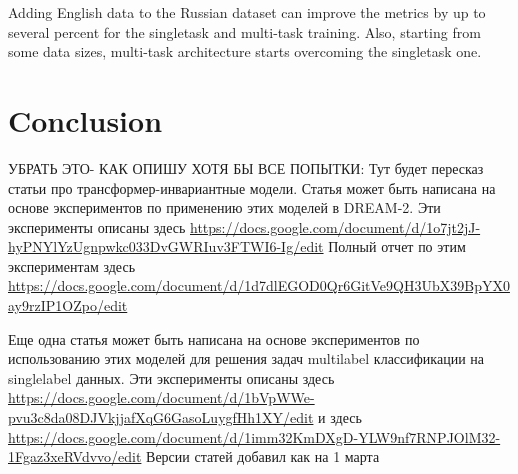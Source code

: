 Adding English data to the Russian dataset can improve the metrics by up to several percent for the singletask and multi-task training. Also, starting from some data sizes, multi-task architecture starts overcoming the singletask one.


\section{Conclusion}


УБРАТЬ ЭТО- КАК ОПИШУ ХОТЯ БЫ ВСЕ ПОПЫТКИ:
Тут будет пересказ статьи про трансформер-инвариантные модели. 
Статья может быть написана на основе экспериментов по применению этих моделей в DREAM-2. Эти эксперименты описаны здесь \url{https://docs.google.com/document/d/1o7jt2jJ-hyPNYlYzUgnpwkc033DvGWRIuv3FTWI6-Ig/edit}
Полный отчет по этим экспериментам здесь \url{https://docs.google.com/document/d/1d7dlEGOD0Qr6GitVe9QH3UbX39BpYX0ay9rzIP1OZpo/edit}

Еще одна статья может быть написана на основе экспериментов по использованию этих моделей для решения задач multilabel классификации на singlelabel данных. Эти эксперименты описаны здесь
\url{https://docs.google.com/document/d/1bVpWWe-pvu3c8da08DJVkjjafXqG6GasoLuygfHh1XY/edit}
и здесь 
\url{https://docs.google.com/document/d/1imm32KmDXgD-YLW9nf7RNPJOlM32-1Fgaz3xeRVdvvo/edit}
Версии статей добавил как на 1 марта


